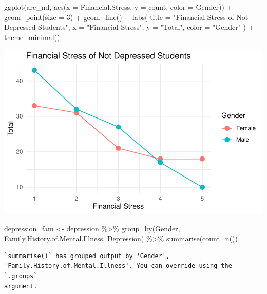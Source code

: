 \documentclass[
  letterpaper,
  DIV=11,
  numbers=noendperiod]{scrartcl}
\newenvironment{Shaded}{\begin{snugshade}}{\end{snugshade}}
\newcommand{\AttributeTok}[1]{\textcolor[rgb]{0.40,0.45,0.13}{#1}}
\newcommand{\DecValTok}[1]{\textcolor[rgb]{0.68,0.00,0.00}{#1}}
\newcommand{\FunctionTok}[1]{\textcolor[rgb]{0.28,0.35,0.67}{#1}}
\newcommand{\NormalTok}[1]{\textcolor[rgb]{0.00,0.23,0.31}{#1}}
\newcommand{\OtherTok}[1]{\textcolor[rgb]{0.00,0.23,0.31}{#1}}
\newcommand{\SpecialCharTok}[1]{\textcolor[rgb]{0.37,0.37,0.37}{#1}}
\newcommand{\StringTok}[1]{\textcolor[rgb]{0.13,0.47,0.30}{#1}}
\begin{document}
\begin{Shaded}
\begin{Highlighting}[]
\FunctionTok{ggplot}\NormalTok{(are\_nd, }\FunctionTok{aes}\NormalTok{(}\AttributeTok{x =}\NormalTok{ Financial.Stress, }\AttributeTok{y =}\NormalTok{ count, }\AttributeTok{color =}\NormalTok{ Gender)) }\SpecialCharTok{+}
  \FunctionTok{geom\_point}\NormalTok{(}\AttributeTok{size =} \DecValTok{3}\NormalTok{) }\SpecialCharTok{+}    
  \FunctionTok{geom\_line}\NormalTok{() }\SpecialCharTok{+}       
  \FunctionTok{labs}\NormalTok{(}
    \AttributeTok{title =} \StringTok{"Financial Stress of Not Depressed Students"}\NormalTok{,}
    \AttributeTok{x =} \StringTok{"Financial Stress"}\NormalTok{,}
    \AttributeTok{y =} \StringTok{"Total"}\NormalTok{,}
    \AttributeTok{color =} \StringTok{"Gender"}
\NormalTok{  ) }\SpecialCharTok{+}
  \FunctionTok{theme\_minimal}\NormalTok{() }
\end{Highlighting}
\end{Shaded}

\includegraphics{Data_files/figure-pdf/unnamed-chunk-10-2.pdf}

\begin{Shaded}
\begin{Highlighting}[]
\NormalTok{depression\_fam }\OtherTok{\textless{}{-}}\NormalTok{ depression }\SpecialCharTok{\%\textgreater{}\%} \FunctionTok{group\_by}\NormalTok{(Gender, Family.History.of.Mental.Illness, Depression) }\SpecialCharTok{\%\textgreater{}\%} \FunctionTok{summarise}\NormalTok{(}\AttributeTok{count=}\FunctionTok{n}\NormalTok{())}
\end{Highlighting}
\end{Shaded}

\begin{verbatim}
`summarise()` has grouped output by 'Gender',
'Family.History.of.Mental.Illness'. You can override using the `.groups`
argument.
\end{verbatim}
\end{document}
